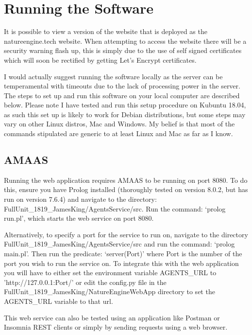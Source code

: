 \documentclass[]{final_report}
\begin{document}
\section{Running the Software}
\label{appendix:softrun}
It is possible to view a version of the website that is deployed as the natureengine.tech website. When attempting to access the website there will be a security warning flash up, this is simply due to the use of self signed certificates which will soon be rectified by getting Let's Encrypt certificates.\par 
I would actually suggest running the software locally as the server can be temperamental with timeouts due to the lack of processing power in the server. The steps to set up and run this software on your local computer are described below. Please note I have tested and run this setup procedure on Kubuntu 18.04, as such this set up is likely to work for Debian distributions, but some steps may vary on other Linux distros, Mac and Windows. My belief is that most of the commands stipulated are generic to at least Linux and Mac as far as I know.

\subsection{AMAAS}
Running the web application requires AMAAS to be running on port 8080. To do this, ensure you have Prolog installed (thoroughly tested on version 8.0.2, but has run on version 7.6.4) and navigate to the directory:\\ FullUnit\_1819\_JamesKing/AgentsService/src. Run the command: `prolog run.pl', which starts the web service on port 8080.\par 
Alternatively, to specify a port for the service to run on, navigate to the directory FullUnit\_1819\_JamesKing/AgentsService/src and run the command: `prolog main.pl'. Then run the predicate: `server(Port)' where Port is the number of the port you wish to run the service on. To integrate this with the web application you will have to either set the environment variable AGENTS\_URL to 'http://127.0.0.1:Port/' or edit the config.py file in the FullUnit\_1819\_JamesKing/NatureEngineWebApp directory to set the AGENTS\_URL variable to that url.\par 
This web service can also be tested using an application like Postman or Insomnia REST clients or simply by sending requests using a web browser. 
\end{document}
